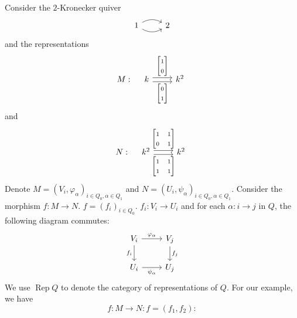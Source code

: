 \documentclass[11pt, a4paper]{report}
\begin{document}
\begin{example}
    Consider the $2$-Kronecker quiver
    \[
        \begin{tikzcd}
            1 \arrow[r, bend left] \arrow[r, bend right] & 2
        \end{tikzcd}
    \]
    and the representations
    \[
        M:\quad
        \begin{tikzcd}
            k \arrow[r, "\begin{bmatrix}1\\0\end{bmatrix}", shift left] \arrow[r, "\begin{bmatrix}0\\1\end{bmatrix}"', shift right] & k^2
        \end{tikzcd}
    \]
    and
    \[
        N:\quad
        \begin{tikzcd}[ampersand replacement=\&]
            k^2 \arrow[r, "{\begin{bmatrix}1 & 1\\0 & 1\end{bmatrix}}", shift left] \arrow[r, "{\begin{bmatrix}1 & 1\\1 & 1\end{bmatrix}}"', shift right] \& k^2
        \end{tikzcd}
    \]
    Denote $M=(V_i, \varphi_\alpha)_{i \in Q_0, \alpha \in Q_1}$ and $N=(U_i, \psi_\alpha)_{i \in Q_0, \alpha \in Q_1}$. Consider the morphism $f:M \to N$. $f=(f_i)_{i \in Q_0}$. $f_i:V_i \to U_i$ and for each $\alpha: i \to j$ in $Q$, the following diagram commutes:
    \[
        \begin{tikzcd}
            V_i \arrow[r, "\varphi_\alpha"] \arrow[d, "f_i"'] & V_j \arrow[d, "f_j"] \\
            U_i \arrow[r, "\psi_\alpha"'] & U_j
        \end{tikzcd}
    \]
    We use $\operatorname{Rep}Q$ to denote the category of representations of $Q$. For our example, we have
    \[
        f:M \to N: f=(f_1,f_2):
    \]


\end{example}
\end{document}
